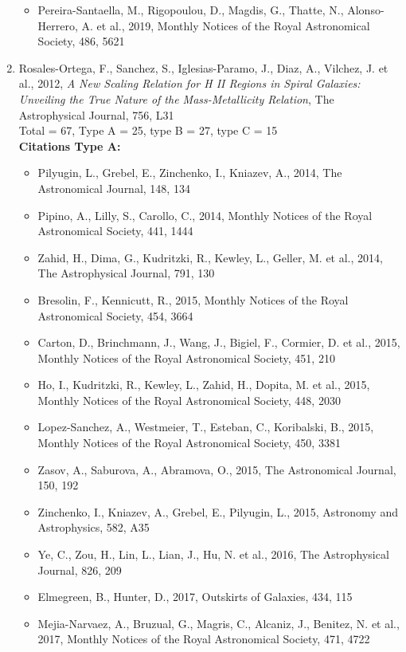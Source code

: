 \documentclass{letter}
\begin{document}
\begin{enumerate}
\begin{itemize}
\item Pereira-Santaella, M., Rigopoulou, D., Magdis, G., Thatte, N., Alonso-Herrero, A. et al., 2019, Monthly Notices of the Royal Astronomical Society, 486, 5621
\end{itemize}
\item Rosales-Ortega, F., Sanchez, S., Iglesias-Paramo, J., Diaz, A., Vilchez, J. et al., 2012, {\it A New Scaling Relation for H II Regions in Spiral Galaxies: Unveiling the True Nature of the Mass-Metallicity Relation}, The Astrophysical Journal, 756, L31 \\ 
Total = 67, Type A = 25, type B = 27, type C = 15 \\ 
{\bf Citations Type A:}
\begin{itemize}
\item Pilyugin, L., Grebel, E., Zinchenko, I., Kniazev, A., 2014, The Astronomical Journal, 148, 134
\item Pipino, A., Lilly, S., Carollo, C., 2014, Monthly Notices of the Royal Astronomical Society, 441, 1444
\item Zahid, H., Dima, G., Kudritzki, R., Kewley, L., Geller, M. et al., 2014, The Astrophysical Journal, 791, 130
\item Bresolin, F., Kennicutt, R., 2015, Monthly Notices of the Royal Astronomical Society, 454, 3664
\item Carton, D., Brinchmann, J., Wang, J., Bigiel, F., Cormier, D. et al., 2015, Monthly Notices of the Royal Astronomical Society, 451, 210
\item Ho, I., Kudritzki, R., Kewley, L., Zahid, H., Dopita, M. et al., 2015, Monthly Notices of the Royal Astronomical Society, 448, 2030
\item Lopez-Sanchez, A., Westmeier, T., Esteban, C., Koribalski, B., 2015, Monthly Notices of the Royal Astronomical Society, 450, 3381
\item Zasov, A., Saburova, A., Abramova, O., 2015, The Astronomical Journal, 150, 192
\item Zinchenko, I., Kniazev, A., Grebel, E., Pilyugin, L., 2015, Astronomy and Astrophysics, 582, A35
\item Ye, C., Zou, H., Lin, L., Lian, J., Hu, N. et al., 2016, The Astrophysical Journal, 826, 209
\item Elmegreen, B., Hunter, D., 2017, Outskirts of Galaxies, 434, 115
\item Mejia-Narvaez, A., Bruzual, G., Magris, C., Alcaniz, J., Benitez, N. et al., 2017, Monthly Notices of the Royal Astronomical Society, 471, 4722

\end{itemize}
\end{enumerate}
\end{document}
